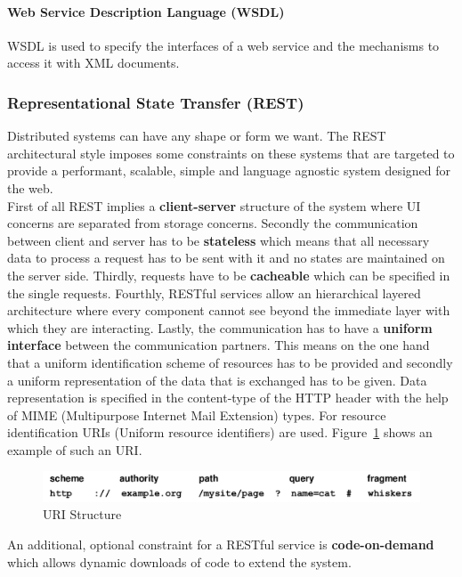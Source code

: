 \paragraph{Web Service Description Language (WSDL)}
WSDL is used to specify the interfaces of a web service and the mechanisms to access it with XML documents.

\subsubsection{Representational State Transfer (REST)}
Distributed systems can have any shape or form we want.
The REST architectural style imposes some constraints on these systems that are targeted to provide a performant, scalable, simple and language agnostic system designed for the web.\\
First of all REST implies a \textbf{client-server} structure of the system where UI concerns are separated from storage concerns.
Secondly the communication between client and server has to be \textbf{stateless} which means that all necessary data to process a request has to be sent with it and no states are maintained on the server side.
Thirdly, requests have to be \textbf{cacheable} which can be specified in the single requests.
Fourthly, RESTful services allow an hierarchical layered architecture where every component cannot see beyond the immediate layer with which they are interacting.
Lastly, the communication has to have a \textbf{uniform interface} between the communication partners.
This means on the one hand that a uniform identification scheme of resources has to be provided and secondly a uniform representation of the data that is exchanged has to be given.
Data representation is specified in the content-type of the HTTP header with the help of MIME (Multipurpose Internet Mail Extension) types.
For resource identification URIs (Uniform resource identifiers) are used.
Figure~\ref{fig:uri} shows an example of such an URI\@.
\begin{figure}[h]
  \centering
  \includegraphics[width=\textwidth]{images/uri.png}
  \caption{URI Structure}\label{fig:uri}
\end{figure}

An additional, optional constraint for a RESTful service is \textbf{code-on-demand} which allows dynamic downloads of code to extend the system.\\

